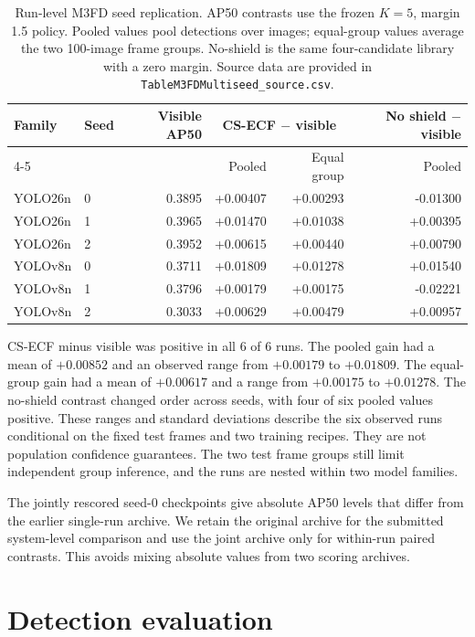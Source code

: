 \documentclass[11pt]{article}
\begin{document}
\begin{table}[ht]
\centering
\small
\caption{Run-level M3FD seed replication. AP50 contrasts use the frozen
\(K=5\), margin 1.5 policy. Pooled values pool detections over images;
equal-group values average the two 100-image frame groups. No-shield is the
same four-candidate library with a zero margin. Source data are provided in
\texttt{TableM3FDMultiseed\_source.csv}.}
\label{tab:m3fd-multiseed}
\begin{tabular}{@{}llrrrr@{}}
\toprule
Family & Seed & Visible AP50 & \multicolumn{2}{c}{CS-ECF \(-\) visible} &
No shield \(-\) visible \\
\cmidrule(lr){4-5}
 & & & Pooled & Equal group & Pooled \\
\midrule
YOLO26n & 0 & 0.3895 & +0.00407 & +0.00293 & -0.01300 \\
YOLO26n & 1 & 0.3965 & +0.01470 & +0.01038 & +0.00395 \\
YOLO26n & 2 & 0.3952 & +0.00615 & +0.00440 & +0.00790 \\
YOLOv8n & 0 & 0.3711 & +0.01809 & +0.01278 & +0.01540 \\
YOLOv8n & 1 & 0.3796 & +0.00179 & +0.00175 & -0.02221 \\
YOLOv8n & 2 & 0.3033 & +0.00629 & +0.00479 & +0.00957 \\
\bottomrule
\end{tabular}
\end{table}

CS-ECF minus visible was positive in all 6 of 6 runs. The pooled gain had a
mean of \(+0.00852\) and an observed range from \(+0.00179\) to \(+0.01809\).
The equal-group gain had a mean of \(+0.00617\) and a range from \(+0.00175\) to
\(+0.01278\). The no-shield contrast changed order across seeds, with four of
six pooled values positive. These ranges and standard deviations describe the
six observed runs conditional on the fixed test frames and two training
recipes. They are not population confidence guarantees. The two test frame
groups still limit independent group inference, and the runs are nested within
two model families.

The jointly rescored seed-0 checkpoints give absolute AP50 levels that differ
from the earlier single-run archive. We retain the original archive for the
submitted system-level comparison and use the joint archive only for
within-run paired contrasts. This avoids mixing absolute values from two
scoring archives.

\section{Detection evaluation}
\end{document}

